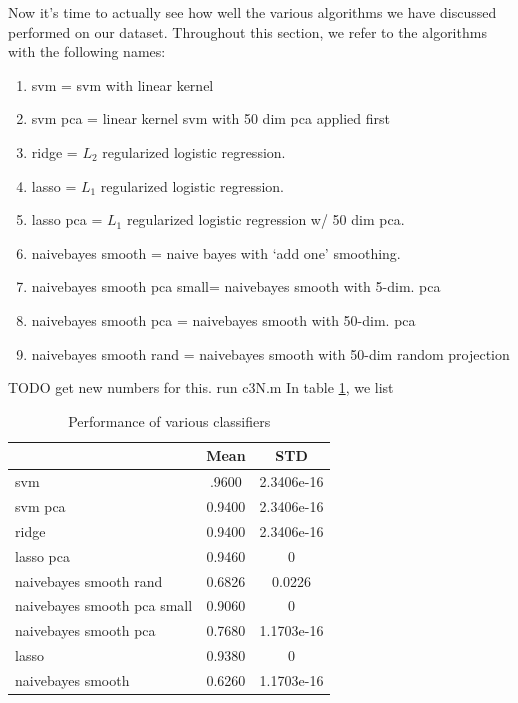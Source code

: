 
%

Now it's time to actually see how well the various algorithms we have discussed performed on our dataset. Throughout this section, we refer to the algorithms with the following names:
\begin{enumerate}
\item svm = svm with linear kernel
\item svm pca = linear kernel svm with 50 dim pca applied first
\item ridge = $L_2$ regularized logistic regression. 
\item lasso = $L_1$ regularized logistic regression.
\item lasso pca = $L_1$ regularized logistic regression w/ 50 dim pca. 
\item naivebayes smooth = naive bayes with `add one' smoothing.
\item naivebayes smooth pca small= naivebayes smooth with 5-dim. pca
\item naivebayes smooth pca = naivebayes smooth with 50-dim. pca
\item naivebayes smooth rand = naivebayes smooth with 50-dim random projection
\end{enumerate}

TODO get new numbers for this. run c3N.m
In table \ref{tab:AccTable}, we list
\begin{center}
\begin{table}
\begin{tabular}{lcc}
\hline
& Mean & STD \\
\hline
svm & .9600 & 2.3406e-16\\
svm pca & 0.9400 & 2.3406e-16\\
ridge & 0.9400 & 2.3406e-16\\
lasso pca & 0.9460 & 0 \\
naivebayes smooth rand & 0.6826 & 0.0226\\
naivebayes smooth pca small & 0.9060 & 0\\
naivebayes smooth pca & 0.7680 & 1.1703e-16\\
lasso & 0.9380 & 0\\
naivebayes smooth & 0.6260 & 1.1703e-16
\end{tabular}
\caption{Performance of various classifiers}
\label{tab:AccTable}
\end{table}
\end{center}


